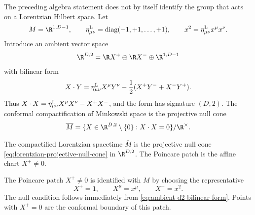 The preceding algebra statement does not by itself identify the group that
acts on a Lorentzian Hilbert space.  Let
\[
  M=\R^{1,D-1},
  \qquad
  \eta^{\rm L}_{\mu\nu}=\operatorname{diag}(-1,+1,\ldots,+1),
  \qquad
  x^2=\eta^{\rm L}_{\mu\nu}x^\mu x^\nu .
\]
Introduce an ambient vector space
\[
  \R^{D,2}
  =
  \R X^+\oplus\R X^-\oplus \R^{1,D-1}
\]
with bilinear form
\begin{equation}
  X\cdot Y
  =
  \eta^{\rm L}_{\mu\nu}X^\mu Y^\nu
  -\frac12(X^+Y^-+X^-Y^+).
  \label{eq:ambient-d2-bilinear-form}
\end{equation}
Thus \(X\cdot X=\eta^{\rm L}_{\mu\nu}X^\mu X^\nu-X^+X^-\), and the form has
signature \((D,2)\).  The conformal compactification of Minkowski space is
the projective null cone
\begin{equation}
  \overline M
  =
  \{X\in\R^{D,2}\setminus\{0\}:X\cdot X=0\}/\R^\times .
  \label{eq:lorentzian-projective-null-cone}
\end{equation}
\begin{definition}
\label{def:lorentzian-conformal-compactification}
The compactified Lorentzian spacetime \(\overline M\) is the projective null
cone \eqref{eq:lorentzian-projective-null-cone} in \(\R^{D,2}\).  The Poincare
patch is the affine chart \(X^+\ne0\).
\end{definition}
The Poincare patch \(X^+\ne0\) is identified with \(M\) by choosing the
representative
\begin{equation}
  X^+=1,\qquad
  X^\mu=x^\mu,\qquad
  X^-=x^2 .
  \label{eq:minkowski-patch-null-cone}
\end{equation}
The null condition follows immediately from
\eqref{eq:ambient-d2-bilinear-form}.  Points with \(X^+=0\) are the conformal
boundary of this patch.

